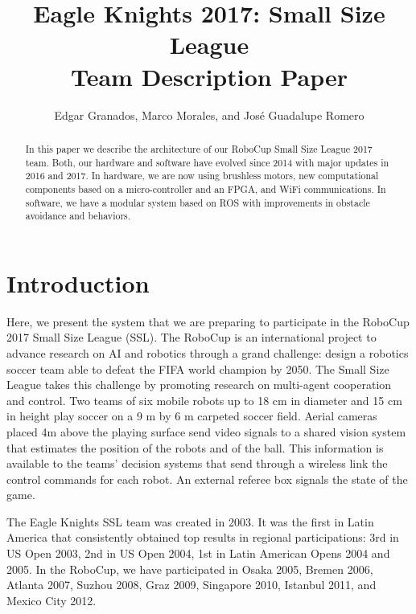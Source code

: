 \documentclass[]{llncs}
\title{\bf Eagle Knights 2017: Small Size League\\ Team Description Paper}
\author{Edgar Granados, Marco Morales, and José Guadalupe Romero}
\institute{Robotics Laboratory, Department of Digital Systems, ITAM\\
Río Hondo 1, Ciudad de México, 01080, México}
\date{}
\begin{document}
\ifpdf
{}
\else
{}
\fi

\maketitle
\begin{abstract}
In this paper we describe the architecture of our RoboCup Small Size League 2017 team. Both, our hardware and software have evolved since 2014 with major updates in 2016 and 2017. In hardware, we are now using brushless motors, new computational components based on a micro-controller and an FPGA, and WiFi communications. In software, we have a modular system based on ROS with improvements in obstacle avoidance and behaviors.
\end{abstract}

\section{Introduction}

Here, we present the system that we are preparing to participate in the RoboCup 2017 Small Size League (SSL). The RoboCup \cite{robocup-ssl-rules} is an international project to advance research on AI and robotics through a grand challenge: design a robotics soccer team able to defeat the FIFA world champion by 2050. The Small Size League takes this challenge by promoting research on multi-agent cooperation and control. Two teams of six mobile robots up to 18 cm in diameter and 15 cm in height play soccer on a 9 m by 6 m carpeted soccer field. Aerial cameras placed 4m above the playing surface send video signals to a shared vision system\cite{zlbwv-sslvtsvsftrcssl-RoboCup-2009} that estimates the position of the robots and of the ball. This information is available to the teams' decision systems that send through a wireless link the control commands for each robot. An external referee box signals the state of the game. 

The Eagle Knights SSL team was created in 2003. It was the first in Latin America that consistently obtained top results in regional participations: 3rd in US Open 2003, 2nd in US Open 2004, 1st in Latin American Opens 2004 and 2005. In the RoboCup, we have participated in Osaka 2005, Bremen 2006, Atlanta 2007, Suzhou 2008, Graz 2009,  Singapore 2010, Istanbul 2011, and Mexico City 2012. 
\end{document}
